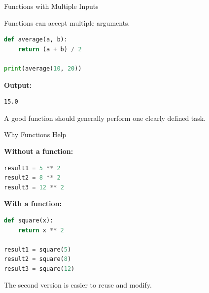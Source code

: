 \documentclass[aspectratio=43,10pt]{beamer}
\begin{document}
\begin{frame}[fragile]{Functions with Multiple Inputs}

Functions can accept multiple arguments.

\begin{lstlisting}[language=Python]
def average(a, b):
    return (a + b) / 2

print(average(10, 20))
\end{lstlisting}

\textbf{Output:}

\begin{lstlisting}
15.0
\end{lstlisting}

\vspace{0.2cm}

A good function should generally perform one clearly defined task.

\end{frame}

\begin{frame}[fragile]{Why Functions Help}

\textbf{Without a function:}

\begin{lstlisting}[language=Python]
result1 = 5 ** 2
result2 = 8 ** 2
result3 = 12 ** 2
\end{lstlisting}

\textbf{With a function:}

\begin{lstlisting}[language=Python]
def square(x):
    return x ** 2

result1 = square(5)
result2 = square(8)
result3 = square(12)
\end{lstlisting}

The second version is easier to reuse and modify.

\end{frame}
\end{document}
